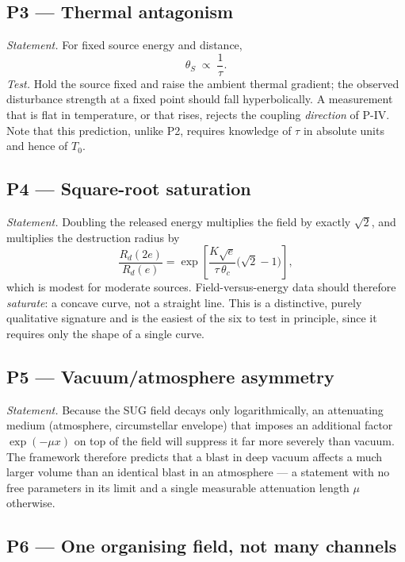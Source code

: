 \documentclass[11pt,a4paper]{article}
\newcommand{\thetaS}{\theta_{S}}
\newcommand{\tgrad}{\tau}
\begin{document}
\subsection{P3 --- Thermal antagonism}

\emph{Statement.} For fixed source energy and distance,
\begin{equation}
  \thetaS \;\propto\; \frac{1}{\tgrad} .
  \label{eq:p3}
\end{equation}
\emph{Test.} Hold the source fixed and raise the ambient thermal gradient; the
observed disturbance strength at a fixed point should fall hyperbolically. A
measurement that is flat in temperature, or that rises, rejects the coupling
\emph{direction} of P-IV. Note that this prediction, unlike P2, requires
knowledge of $\tgrad$ in absolute units and hence of $T_0$.

\subsection{P4 --- Square-root saturation}

\emph{Statement.} Doubling the released energy multiplies the field by
exactly $\sqrt{2}$, and multiplies the destruction radius by
\begin{equation}
  \frac{R_d(2e)}{R_d(e)} = \exp\!\left[
  \frac{K\sqrt{e}}{\tgrad\,\theta_c}\bigl(\sqrt{2}-1\bigr)\right] ,
  \label{eq:p4}
\end{equation}
which is modest for moderate sources. Field-versus-energy data should
therefore \emph{saturate}: a concave curve, not a straight line. This is a
distinctive, purely qualitative signature and is the easiest of the six to
test in principle, since it requires only the shape of a single curve.

\subsection{P5 --- Vacuum/atmosphere asymmetry}

\emph{Statement.} Because the SUG field decays only logarithmically, an
attenuating medium (atmosphere, circumstellar envelope) that imposes an
additional factor $\exp(-\mu x)$ on top of the field will suppress it far
more severely than vacuum. The framework therefore predicts that a blast in
deep vacuum affects a much larger volume than an identical blast in an
atmosphere --- a statement with no free parameters in its limit and a
single measurable attenuation length $\mu$ otherwise.

\subsection{P6 --- One organising field, not many channels}
\end{document}
